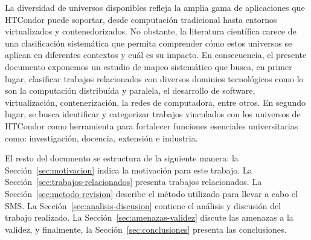 La diversidad de universos disponibles refleja la amplia gama de aplicaciones
que HTCondor puede soportar, desde computación tradicional hasta entornos
virtualizados y contenedorizados. No obstante, la literatura científica carece
de una clasificación sistemática que permita comprender cómo estos universos
se aplican en diferentes contextos y cuál es su impacto. En consecuencia,
el presente documento exponemos un estudio de mapeo sistemático que busca,
en primer lugar, clasificar trabajos relacionados con diversos dominios tecnológicos
como lo son la computación distribuída y paralela, el desarrollo de software,
virtualización, contenerización, la redes de computadora, entre otros. En segundo lugar,
se busca identificar y categorizar trabajos vinculados con los universos de
HTCondor como herramienta para fortalecer funciones esenciales universitarias
como: investigación, docencia, extensión e industria.

El resto del documento se estructura de la siguiente manera:
la Sección~\ref{sec:motivacion} indica la motivación para este trabajo.
La Sección~\ref{sec:trabajos-relacionados} presenta trabajos relacionados.
La Sección~\ref{sec:metodo-revision} describe el método utilizado para llevar a cabo el SMS.
La Sección~\ref{sec:analisis-discusion} contiene el análisis y discusión del trabajo realizado.
La Sección~\ref{sec:amenazas-validez} discute las amenazas a la validez, y finalmente,
la Sección~\ref{sec:conclusiones} presenta las conclusiones.
